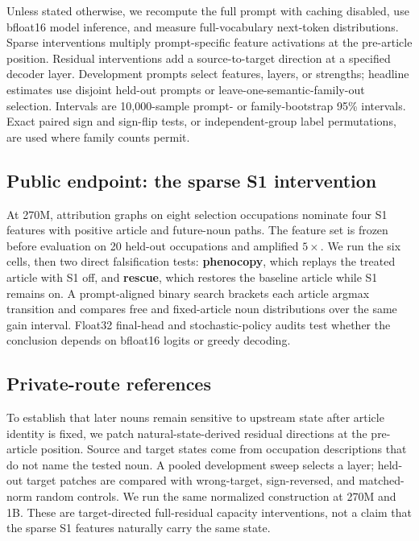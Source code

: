 \documentclass[
]{article}
\begin{document}
Unless stated otherwise, we recompute the full prompt with caching
disabled, use bfloat16 model inference, and measure full-vocabulary
next-token distributions. Sparse interventions multiply prompt-specific
feature activations at the pre-article position. Residual interventions
add a source-to-target direction at a specified decoder layer.
Development prompts select features, layers, or strengths; headline
estimates use disjoint held-out prompts or leave-one-semantic-family-out
selection. Intervals are 10,000-sample prompt- or family-bootstrap 95\%
intervals. Exact paired sign and sign-flip tests, or independent-group
label permutations, are used where family counts permit.

\subsection{Public endpoint: the sparse S1
intervention}\label{public-endpoint-the-sparse-s1-intervention}

At 270M, attribution graphs on eight selection occupations nominate four
S1 features with positive article and future-noun paths. The feature set
is frozen before evaluation on 20 held-out occupations and amplified
\(5\times\). We run the six cells, then two direct falsification tests:
\textbf{phenocopy}, which replays the treated article with S1 off, and
\textbf{rescue}, which restores the baseline article while S1 remains
on. A prompt-aligned binary search brackets each article argmax
transition and compares free and fixed-article noun distributions over
the same gain interval. Float32 final-head and stochastic-policy audits
test whether the conclusion depends on bfloat16 logits or greedy
decoding.

\subsection{Private-route references}\label{private-route-references}

To establish that later nouns remain sensitive to upstream state after
article identity is fixed, we patch natural-state-derived residual
directions at the pre-article position. Source and target states come
from occupation descriptions that do not name the tested noun. A pooled
development sweep selects a layer; held-out target patches are compared
with wrong-target, sign-reversed, and matched-norm random controls. We
run the same normalized construction at 270M and 1B. These are
target-directed full-residual capacity interventions, not a claim that
the sparse S1 features naturally carry the same state.
\end{document}
